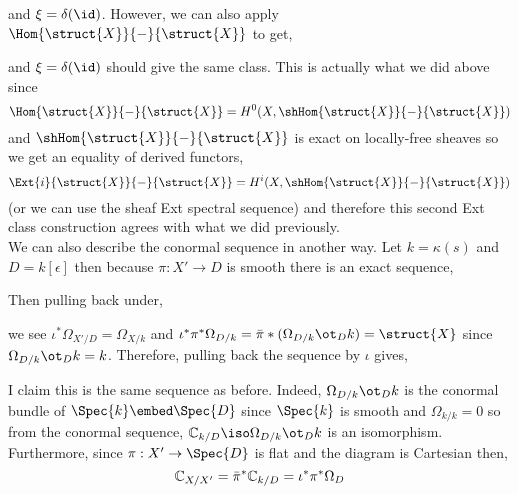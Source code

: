 \documentclass[12pt]{article}
\begin{document}
\begin{rmk}
\begin{center}
\end{center}
and $\xi = \delta(\id)$. However, we can also apply $\Hom{\struct{X}}{-}{\struct{X}}$ to get,
\begin{center}
\end{center}
and $\xi = \delta(\id)$ should give the same class. This is actually what we did above since 
\[ \Hom{\struct{X}}{-}{\struct{X}} = H^0(X, \shHom{\struct{X}}{-}{\struct{X}}) \]
and $\shHom{\struct{X}}{-}{\struct{X}}$ is exact on locally-free sheaves so we get an equality of derived functors,
\[ \Ext{i}{\struct{X}}{-}{\struct{X}} = H^i(X, \shHom{\struct{X}}{-}{\struct{X}}) \]
(or we can use the sheaf Ext spectral sequence) and therefore this second Ext class construction agrees with what we did previously. 
\bigskip\\
We can also describe the conormal sequence in another way. Let $k = \kappa(s)$ and $D = k[\epsilon]$ then because $\pi : X' \to D$ is smooth there is an exact sequence,
\begin{center}
\end{center}
Then pulling back under,
\begin{center}
\end{center}
we see $\iota^* \Omega_{X'/D} = \Omega_{X/k}$ and $\iota^* \pi^* \Omega_{D/k} = \bar{\pi}*(\Omega_{D/k} \ot_D k) = \struct{X}$ since$\Omega_{D/k} \ot_D k = k$. Therefore, pulling back the sequence by $\iota$ gives,
\begin{center}
\end{center}
I claim this is the same sequence as before. Indeed, $\Omega_{D/k} \ot_D k$ is the conormal bundle of $\Spec{k} \embed \Spec{D}$ since $\Spec{k}$ is smooth and $\Omega_{k/k} = 0$ so from the conormal sequence, $\C_{k/D} \iso \Omega_{D/k} \ot_D k$ is an isomorphism. Furthermore, since $\pi : X' \to \Spec{D}$ is flat and the diagram is Cartesian then,
\[ \mathbb{C}_{X/X'} = \bar{\pi}^* \mathbb{C}_{k/D} = \iota^* \pi^* \Omega_{D} \]
\end{rmk}
\end{document}
